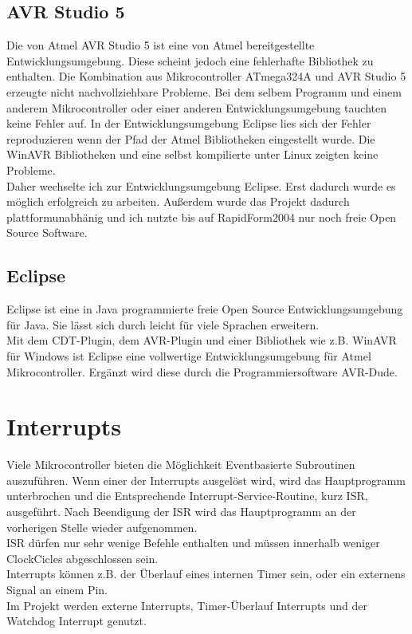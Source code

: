 \subsection{AVR Studio 5}
Die von Atmel AVR Studio 5 ist eine von Atmel bereitgestellte Entwicklungsumgebung. Diese scheint jedoch eine fehlerhafte Bibliothek zu enthalten. Die Kombination aus Mikrocontroller ATmega324A und AVR Studio 5 erzeugte nicht nachvollziehbare Probleme. Bei dem selbem Programm und einem anderem Mikrocontroller oder einer anderen Entwicklungsumgebung tauchten keine Fehler auf.
In der Entwicklungsumgebung Eclipse lies sich der Fehler reproduzieren wenn der Pfad der Atmel Bibliotheken eingestellt wurde. Die WinAVR Bibliotheken und eine selbst kompilierte  unter Linux zeigten keine Probleme.\\
Daher wechselte ich zur  Entwicklungsumgebung Eclipse. Erst dadurch wurde es möglich erfolgreich zu arbeiten. Außerdem wurde das Projekt dadurch plattformunabhänig und ich nutzte bis auf RapidForm2004 nur noch freie Open Source Software.\\
\subsection{Eclipse}
Eclipse ist eine in Java programmierte freie Open Source Entwicklungsumgebung für Java. Sie lässt sich durch  leicht für viele Sprachen erweitern.\\
Mit dem CDT-Plugin, dem AVR-Plugin und einer Bibliothek wie z.B. WinAVR für Windows ist Eclipse eine vollwertige Entwicklungsumgebung für Atmel Mikrocontroller. 
Ergänzt wird diese durch die Programmiersoftware AVR-Dude.\\

\section{Interrupts}
\label{sec:Interrupts}
Viele Mikrocontroller bieten die Möglichkeit Eventbasierte Subroutinen auszuführen. Wenn einer der Interrupts ausgelöst wird, wird das Hauptprogramm unterbrochen und die Entsprechende Interrupt-Service-Routine, kurz ISR, ausgeführt. Nach Beendigung der ISR wird das Hauptprogramm an der  vorherigen Stelle wieder aufgenommen.\\
ISR dürfen nur sehr wenige Befehle enthalten und müssen innerhalb weniger ClockCicles abgeschlossen sein. \\
Interrupts können z.B. der Überlauf eines internen Timer sein, oder ein externens Signal an einem Pin.\\
Im Projekt werden externe Interrupts, Timer-Überlauf Interrupts und der Watchdog Interrupt genutzt. 

